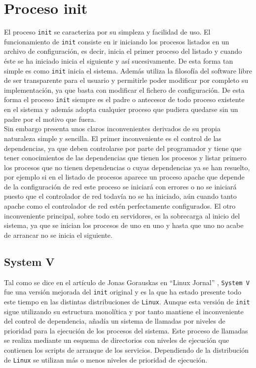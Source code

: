 \section{Proceso init} %
El proceso \texttt{init} se caracteriza por su simpleza y facilidad de uso. El funcionamiento de \texttt{init} consiste en ir iniciando los procesos listados en un archivo de configuración, es decir, inicia el primer proceso del listado y cuando éste se ha iniciado inicia el siguiente y así sucesivamente. De esta forma tan simple es como \texttt{init} inicia el sistema. Además utiliza la filosofía del software libre de ser transparente para el usuario y permitirle poder modificar por completo su implementación, ya que basta con modificar el fichero de configuración. De esta forma el proceso \texttt{init} siempre es el padre o antecesor de todo proceso existente en el sistema y además adopta cualquier proceso que pudiera quedarse sin un padre por el motivo que fuera.\\

Sin embargo presenta unos claros inconvenientes derivados de su propia naturaleza simple y sencilla. El primer inconveniente es el control de las dependencias, ya que deben controlarse por parte del programador y tiene que tener conocimientos de las dependencias que tienen los procesos y listar primero los procesos que no tienen dependencias o cuyas dependencias ya se han resuelto, por ejemplo si en el listado de procesos aparece un proceso apache que depende de la configuración de red este proceso se iniciará con errores o no se iniciará puesto que el controlador de red todavía no se ha iniciado, aún cuando tanto apache como el controlador de red estén perfectamente configurados. El otro inconveniente principal, sobre todo en servidores, es la sobrecarga al inicio del sistema, ya que se inician los procesos de uno en uno y hasta que uno no acabe de arrancar no se inicia el siguiente.

\subsection{System V }
Tal como se dice en el artículo de Jonas Gorauskas en ``Linux Jornal'' \cite{SysV}, \texttt{System V} fue una versión mejorada del \texttt{init} original y es la que ha estado presente todo este tiempo en las distintas distribuciones de \texttt{Linux}. Aunque esta versión de \texttt{init} sigue utilizando su estructura monolítica y por tanto mantiene el inconveniente del control de dependencia, añadía un sistema de llamadas por niveles de prioridad para la ejecución de los procesos del sistema. Este proceso de llamadas se realiza mediante un esquema de directorios con niveles de ejecución  que contienen los scripts de arranque de los servicios. Dependiendo de la distribución de \texttt{Linux} se utilizan más o menos niveles de prioridad de ejecución.\\


